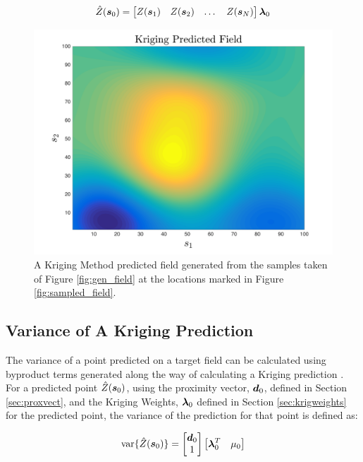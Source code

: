 \begin{equation}
    \hat{Z}({\it{\boldsymbol{s}}}_0) = \begin{bmatrix} Z({\it{\boldsymbol{s}}}_1) & Z({\it{\boldsymbol{s}}}_2) & \dots & Z({\it{\boldsymbol{s}}}_N) \end{bmatrix}{\it{\boldsymbol{\lambda}}}_{0}
    \label{eq:krigeq}
\end{equation}

\begin{figure}[!]
    \centering
    \includegraphics[width=0.8\linewidth]{figures/kriging_prediction.png}
    \ssp
    \caption{A Kriging Method predicted field generated from the samples taken of Figure \ref{fig:gen_field} at the locations marked in Figure \ref{fig:sampled_field}.}
    \label{fig:krig_field}
\end{figure}

\subsection{Variance of A Kriging Prediction} \label{sec:krigvar}
The variance of a point predicted on a target field can be calculated using byproduct terms generated along the way of calculating a Kriging prediction \cite{felus:srn}. For a predicted point $\hat{Z}({\it{\boldsymbol{s}}}_0)$, using the proximity vector, ${\it{\boldsymbol{d}}}_0$, defined in Section \ref{sec:proxvect}, and the Kriging Weights, ${\it{\boldsymbol{\lambda}}}_0$ defined in Section \ref{sec:krigweights} for the predicted point, the variance of the prediction for that point is defined as:

\begin{equation}
    \text{var}\{\hat{Z}({\it{\boldsymbol{s}}}_0)\} = \begin{bmatrix}{\it{\boldsymbol{d}}}_0 \\ 1\end{bmatrix} \begin{bmatrix}{\it{\boldsymbol{\lambda}}}_0^T & \mu_0 \end{bmatrix}
\end{equation}

